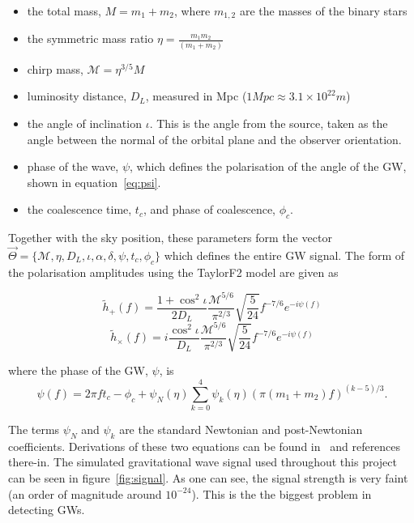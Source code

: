 \documentclass{jpconf}
\newcommand{\gws}{\tilde{h}}
\begin{document}
\begin{itemize}
\item the total mass, $M = m_{1}+m_{2}$, where $m_{1,2}$ are the masses of the binary stars
\item the symmetric mass ratio $\eta = \frac{m_{1}m_{2}}{(m_{1}+m_{2})}$
\item chirp mass, $\mathcal{M} = \eta^{3/5}M$
\item luminosity distance, $D_{L}$, measured in Mpc ($1 Mpc \approx   3.1\times10^{22}m  $)
\item the angle of inclination $\iota$. This is the angle from the source, taken as the angle between the normal of the orbital plane and the observer orientation.
\item phase of the wave, $\psi$, which defines the polarisation of the angle of the GW, shown in equation~\ref{eq:psi}.
\item the coalescence time, $t_c$, and phase of coalescence, $\phi_c$.
\end{itemize}
 
Together with the sky position, these parameters form the vector $\vec{\Theta} = \{\mathcal{M}, \eta, D_{L}, \iota, \alpha, \delta, \psi, t_{c}, \phi_{c}\}$ which defines the entire GW signal. 
The form of the polarisation amplitudes using the TaylorF2 model are given as~\cite{SathSchutz,pN,TF2}

\begin{equation}
  \gws_{+}(f) = \frac{1+\cos^{2}\iota}{2D_{L}} \frac{\mathcal{M}^{5/6}}{\pi^{2/3}} \sqrt{\frac{5}{24}}f^{-7/6}e^{-i\psi(f)}
\end{equation}
\begin{equation}
  \gws_{\times}(f) = i\frac{\cos^{2}\iota}{D_{L}}\frac{\mathcal{M}^{5/6}}{\pi^{2/3}} \sqrt{\frac{5}{24}}f^{-7/6}e^{-i\psi(f)}
\end{equation}

where the phase of the GW, $\psi$, is 
\begin{equation}
  \label{eq:psi}
  \psi(f) = 2\pi f t_c - \phi_c + \psi_N(\eta)\sum\limits_{k=0}^4{\psi_k(\eta) (\pi(m_1 + m_2)f)^{(k-5)/3}}.
\end{equation}

The terms $\psi_N$ and $\psi_k$ are the standard Newtonian and post-Newtonian coefficients. Derivations of these two equations can be found in~\cite{pN} and references there-in. The simulated gravitational wave signal used throughout this project can be seen in figure~\ref{fig:signal}. As one can see, the signal strength is very faint (an order of magnitude around $10^{-24}$). This is the the biggest problem in detecting GWs.
\end{document}
